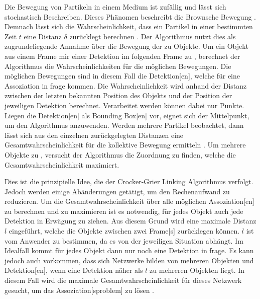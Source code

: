 Die Bewegung von Partikeln in einem Medium ist zufällig und lässt sich stochastisch Beschreiben. Dieses Phänomen beschreibt die \gls{Brownsche Bewegung} \cite{Nelson.1972}. Demnach lässt sich die Wahrscheinlichkeit, dass ein Partikel in einer bestimmten Zeit \(t\) eine Distanz \(\delta\) zurücklegt berechnen \cite{Crocker.1996} . Der Algorithmus nutzt dies als zugrundeliegende Annahme über die Bewegung der zu  Objekte. Um ein Objekt aus einem \gls{Frame} mir einer \gls{Detektion} im folgenden \gls{Frame} zu , berechnet der Algorithmus die Wahrscheinlichkeiten für die möglichen Bewegungen. Die möglichen Bewegungen sind in diesem Fall die \gls{Detektion}[en], welche für eine \gls{Assoziation} in frage kommen. Die Wahrscheinlichkeit wird anhand der Distanz zwischen der letzten bekannten Position des Objekts und der Position der jeweiligen \gls{Detektion} berechnet. Verarbeitet werden können dabei nur Punkte. Liegen die \gls{Detektion}[en] als \gls{Bounding Box}[en] vor, eignet sich der Mittelpunkt, um den Algorithmus anzuwenden. Werden mehrere Partikel beobachtet, dann lässt sich aus den einzelnen zurückgelegten Distanzen eine Gesamtwahrscheinlichkeit für die kollektive Bewegung ermitteln \cite{Crocker.1996} . Um mehrere Objekte zu , versucht der Algorithmus die Zuordnung zu finden, welche die Gesamtwahrscheinlichkeit maximiert. \par

Dies ist die prinzipielle Idee, die der Crocker-Grier Linking Algorithmus verfolgt. Jedoch werden einige Abänderungen getätigt, um den Rechenaufwand zu reduzieren. Um die Gesamtwahrscheinlichkeit über alle möglichen \gls{Assoziation}[en] zu berechnen und zu maximieren ist es notwendig, für jedes Objekt auch jede \gls{Detektion} in Erwägung zu ziehen. Aus diesem Grund wird eine maximale Distanz \(l\) eingeführt, welche die Objekte zwischen zwei \gls{Frame}[s] zurücklegen können. \(l\) ist vom Anwender zu bestimmen, da es von der jeweiligen Situation abhängt. Im Idealfall kommt für jedes Objekt dann nur noch eine \gls{Detektion} in frage. Es kann jedoch auch vorkommen, dass sich Netzwerke bilden von mehreren Objekten und \gls{Detektion}[en], wenn eine \gls{Detektion} näher als \(l\) zu mehreren Objekten liegt. In diesem Fall wird die maximale Gesamtwahrscheinlichkeit für dieses Netzwerk gesucht, um das \gls{Assoziation}[sproblem] zu lösen \cite{Crocker.1996}. \par

